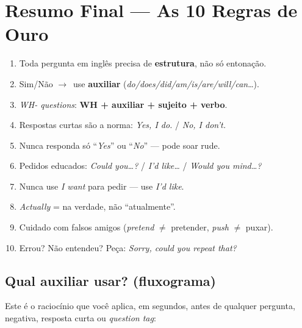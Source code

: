 \documentclass[12pt,a4paper,oneside]{book}
\newcommand{\en}[1]{\textit{#1}}                 %
\newcommand{\ra}{$\rightarrow$}
\begin{document}
\chapter{Resumo Final --- As 10 Regras de Ouro}
\label{cap:revisao}

\begin{enumerate}
  \item Toda pergunta em inglês precisa de \textbf{estrutura}, não só entonação.
  \item Sim/Não \ra\ use \textbf{auxiliar} (\en{do/does/did/am/is/are/will/can}\ldots).
  \item \emph{WH- questions}: \textbf{WH + auxiliar + sujeito + verbo}.
  \item Respostas curtas são a norma: \en{Yes, I do.} / \en{No, I don't.}
  \item Nunca responda só ``\en{Yes}'' ou ``\en{No}'' --- pode soar rude.
  \item Pedidos educados: \en{Could you\ldots?} / \en{I'd like\ldots} / \en{Would you mind\ldots?}
  \item Nunca use \en{I want} para pedir --- use \en{I'd like}.
  \item \en{Actually} = na verdade, não ``atualmente''.
  \item Cuidado com falsos amigos (\en{pretend} $\neq$ pretender, \en{push} $\neq$ puxar).
  \item Errou? Não entendeu? Peça: \en{Sorry, could you repeat that?}
\end{enumerate}

\section{Qual auxiliar usar? (fluxograma)}

Este é o raciocínio que você aplica, em segundos, antes de qualquer pergunta, negativa, resposta curta ou \emph{question tag}:
\end{document}
